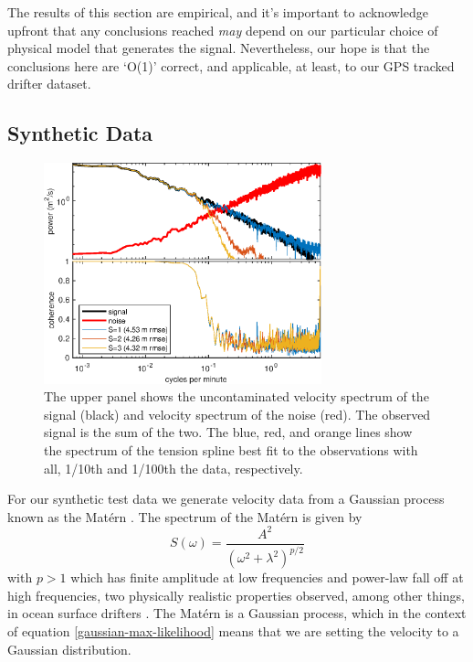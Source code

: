\documentclass[10pt,journal]{IEEEtran}
\begin{document}
The results of this section are empirical, and it's important to acknowledge upfront that any conclusions reached \emph{may} depend on our particular choice of physical model that generates the signal. Nevertheless, our hope is that the conclusions here are `O(1)' correct, and applicable, at least, to our GPS tracked drifter dataset.

\subsection{Synthetic Data} \label{sec:synthetic_data}

\begin{figure}
  \centerline{\includegraphics[width=19pc,angle=0]{figures/synthetic_process_and_spectrum_slope2degreeVaried}}
  
  \caption{The upper panel shows the uncontaminated velocity spectrum of the signal (black) and velocity spectrum of the noise (red). The observed signal is the sum of the two. The blue, red, and orange lines show the spectrum of the tension spline best fit to the observations with all, 1/10th and 1/100th the data, respectively.}
  \label{varied_slope}
\end{figure}

For our synthetic test data we generate velocity data from a Gaussian process known as the Mat\'ern \cite{lilly2017-npg}. The spectrum of the Mat\'ern is given by
\begin{equation}
S(\omega) = \frac{A^2}{(\omega^2 + \lambda^2)^{p/2}}
\end{equation}
with $p>1$ which has finite amplitude at low frequencies and power-law fall off at high frequencies, two physically realistic properties observed, among other things, in ocean surface drifters \cite{sykulski2016-jrssc}. The Mat\'ern is a Gaussian process, which in the context of equation \ref{gaussian-max-likelihood} means that we are setting the velocity to a Gaussian distribution.
\end{document}
